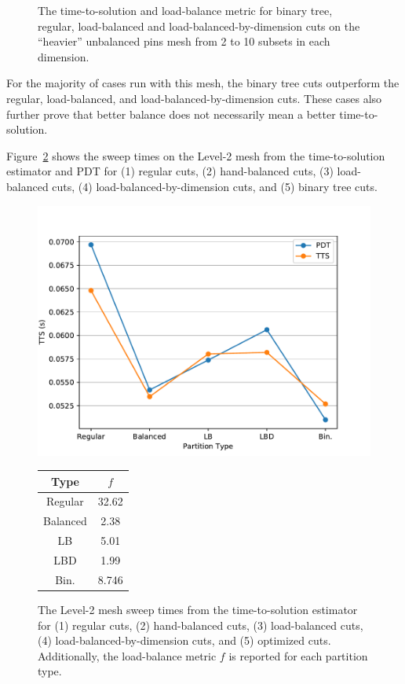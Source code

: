 \begin{figure}[h]
\begin{subfigure}[t]{0.49\textwidth}
  \end{subfigure}  
  \caption{The time-to-solution and load-balance metric for binary tree, regular, load-balanced and load-balanced-by-dimension cuts on the ``heavier'' unbalanced pins mesh from 2 to 10 subsets in each dimension.}
  \label{ubp_opt_heavy}
\end{figure}
For the majority of cases run with this mesh, the binary tree cuts outperform the regular, load-balanced, and load-balanced-by-dimension cuts. These cases also further prove that better balance does not necessarily mean a better time-to-solution.

Figure~\ref{level2_opt} shows the sweep times on the Level-2 mesh from the time-to-solution estimator and PDT for (1) regular cuts, (2) hand-balanced cuts, (3) load-balanced cuts, (4) load-balanced-by-dimension cuts, and (5) binary tree cuts.
\begin{figure}[h]
\begin{minipage}[c]{0.65\textwidth}
\centering
\includegraphics[scale=0.775]{../../figures/level2_sweep_comp_best.pdf}
\end{minipage}
\begin{minipage}[c]{0.33\textwidth}
\begin{table}[H]
\centering
\begin{tabular}{c|c}
\textbf{Type} & \bf $f$ \\ \hline
Regular &  32.62 \\ \hline
Balanced & 2.38 \\ \hline
LB & 5.01 \\ \hline
LBD &  1.99\\ \hline
Bin. & 8.746 \\ \hline
\end{tabular}
\end{table}
\end{minipage}
\caption{The Level-2 mesh sweep times from the time-to-solution estimator for (1) regular cuts, (2) hand-balanced cuts, (3) load-balanced cuts, (4) load-balanced-by-dimension cuts, and (5) optimized cuts. Additionally, the load-balance metric $f$ is reported for each partition type. }
\label{level2_opt}
\end{figure}
